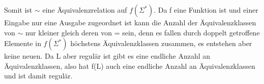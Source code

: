 \documentclass[12pt, a4paper]{article}
\begin{document}
Somit ist $\sim$ eine Äquivalenzrelation auf $f(\Sigma^*)$. Da f eine Funktion ist und einer Eingabe nur eine Ausgabe zugeordnet ist kann die Anzahl der Äquivalenzklassen von $\sim$ nur kleiner gleich deren von = sein, denn es fallen durch doppelt getroffene Elemente in $f(\Sigma^*)$ höchstens Äquivalenzklassen zusammen, es entstehen aber keine neuen. Da L aber regulär ist gibt es eine endliche Anzahl an Äquivalenzklassen, also hat f(L) auch eine endliche Anzahl an Äquivalenzklassen und ist damit regulär.
\end{document}
